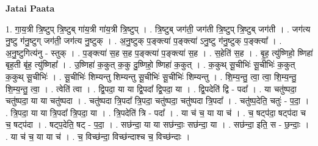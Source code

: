 \documentclass[17pt]{extarticle}
\begin{document}
\textbf{Jatai Paata} \newline

1. गा॒य॒त्री त्रि॒ष्टुप् त्रि॒ष्टुब् गा॑य॒त्री गा॑य॒त्री त्रि॒ष्टुप् । . त्रि॒ष्टुब् जग॑ती॒ जग॑ती त्रि॒ष्टुप् त्रि॒ष्टुब् जग॑ती । . जग॑त्य नु॒ष्टु ग॑नु॒ष्टुग् जग॑ती॒ जग॑त्य नु॒ष्टुक् । . अ॒नु॒ष्टुक् प॒ङ्क्त्या॑ प॒ङ्क्त्या॑ ऽनु॒ष्टु ग॑नु॒ष्टुक् प॒ङ्क्त्या᳚ । . अ॒नु॒ष्टुगित्य॑नु - स्तुक् । . प॒ङ्क्त्या॑ स॒ह स॒ह प॒ङ्क्त्या॑ प॒ङ्क्त्या॑ स॒ह । . स॒हेति॑ स॒ह । . बृ॒ह॒ त्यु॑ष्णिहो॒ ष्णिहा॑ बृह॒ती बृ॑ह॒ त्यु॑ष्णिहा᳚ । . उ॒ष्णिहा॑ क॒कुत् क॒कु दु॒ष्णिहो॒ ष्णिहा॑ क॒कुत् । . क॒कुथ् सू॒चीभिः॑ सू॒चीभिः॑ क॒कुत् क॒कुथ् सू॒चीभिः॑ । . सू॒चीभिः॑ शिम्यन्तु शिम्यन्तु सू॒चीभिः॑ सू॒चीभिः॑ शिम्यन्तु । . शि॒म्य॒न्तु॒ त्वा॒ त्वा॒ शि॒म्य॒न्तु॒ शि॒म्य॒न्तु॒ त्वा॒ । . त्वेति॑ त्वा । . द्वि॒पदा॒ या या द्वि॒पदा᳚ द्वि॒पदा॒ या । . द्वि॒पदेति॑ द्वि - पदा᳚ । . या चतु॑ष्पदा॒ चतु॑ष्पदा॒ या या चतु॑ष्पदा । . चतु॑ष्पदा त्रि॒पदा᳚ त्रि॒पदा॒ चतु॑ष्पदा॒ चतु॑ष्पदा त्रि॒पदा᳚ । . चतु॑ष्प॒देति॒ चतुः॑ - प॒दा॒ । . त्रि॒पदा॒ या या त्रि॒पदा᳚ त्रि॒पदा॒ या । . त्रि॒पदेति॑ त्रि - पदा᳚ । . या च॑ च॒ या या च॑ । . च॒ षट्प॑दा॒ षट्प॑दा च च॒ षट्प॑दा । . षट्प॒देति॒ षट् - प॒दा॒ । . सछ॑न्दा॒ या या सछ॑न्दाः॒ सछ॑न्दा॒ या । . सछ॑न्दा॒ इति॒ स - छ॒न्दाः॒ । . या च॑ च॒ या या च॑ । . च॒ विच्छ॑न्दा॒ विच्छ॑न्दाश्च च॒ विच्छ॑न्दाः । \newline
\end{document}
